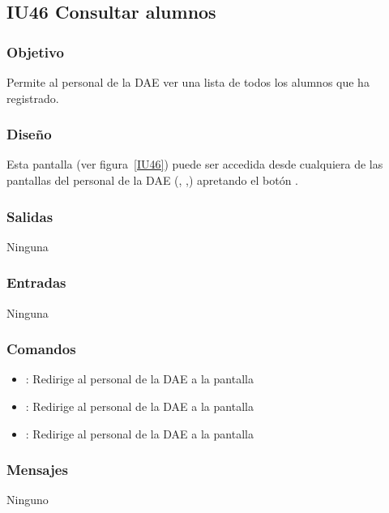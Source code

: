 
\subsection{IU46 Consultar alumnos}

\subsubsection{Objetivo}
Permite al personal de la DAE ver una lista de todos los alumnos que ha registrado.
\subsubsection{Diseño}
Esta pantalla  (ver figura~\ref{IU46}) puede ser accedida desde cualquiera de las pantallas del personal de la DAE (, ,) apretando el botón .


\subsubsection{Salidas}
Ninguna
\subsubsection{Entradas}
Ninguna
\subsubsection{Comandos}
\begin{itemize}
	\item {}: Redirige al personal de la DAE a la pantalla 
	\item {}: Redirige al personal de la DAE a la pantalla 
	\item {}: Redirige al personal de la DAE a la pantalla 
	
\end{itemize}

\subsubsection{Mensajes}
Ninguno
